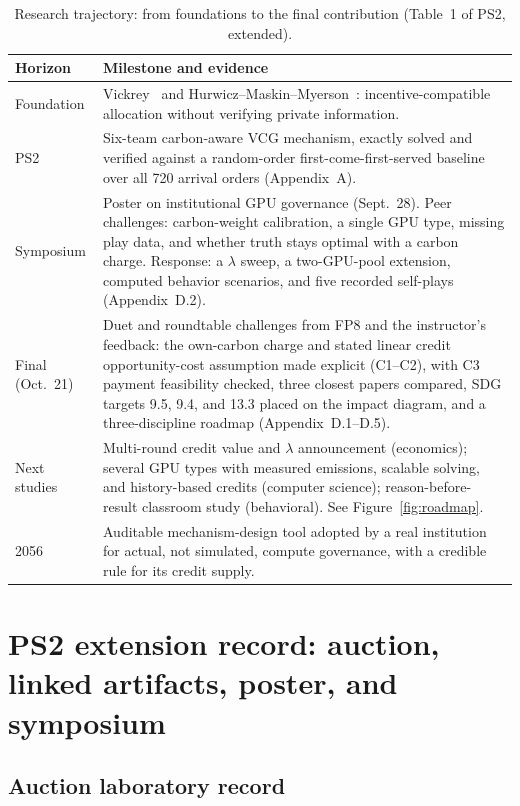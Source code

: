 \begin{table}[H]
\caption{Research trajectory: from foundations to the final contribution (Table~1 of PS2, extended).}
\label{tab:trajectory}
\begin{tabularx}{\textwidth}{@{}p{}Y@{}}
\toprule
\textbf{Horizon}&\textbf{Milestone and evidence}\\
\midrule
Foundation&Vickrey~\cite{nobel1996} and Hurwicz--Maskin--Myerson~\cite{nobel2007}: incentive-compatible allocation without verifying private information.\\
PS2&Six-team carbon-aware VCG mechanism, exactly solved and verified against a random-order first-come-first-served baseline over all 720 arrival orders (Appendix~A).\\
Symposium&Poster on institutional GPU governance (Sept.~28). Peer challenges: carbon-weight calibration, a single GPU type, missing play data, and whether truth stays optimal with a carbon charge. Response: a $\lambda$ sweep, a two-GPU-pool extension, computed behavior scenarios, and five recorded self-plays (Appendix~D.2).\\
Final (Oct.~21)&Duet and roundtable challenges from FP8 and the instructor's feedback: the own-carbon charge and stated linear credit opportunity-cost assumption made explicit (C1--C2), with C3 payment feasibility checked, three closest papers compared, SDG targets 9.5, 9.4, and 13.3 placed on the impact diagram, and a three-discipline roadmap (Appendix~D.1--D.5).\\
Next studies&Multi-round credit value and $\lambda$ announcement (economics); several GPU types with measured emissions, scalable solving, and history-based credits (computer science); reason-before-result classroom study (behavioral). See Figure~\ref{fig:roadmap}.\\
2056&Auditable mechanism-design tool adopted by a real institution for actual, not simulated, compute governance, with a credible rule for its credit supply.\\
\bottomrule
\end{tabularx}
\end{table}


\clearpage\twocolumn
\section{PS2 extension record: auction, linked artifacts, poster, and symposium}
\subsection{Auction laboratory record}

